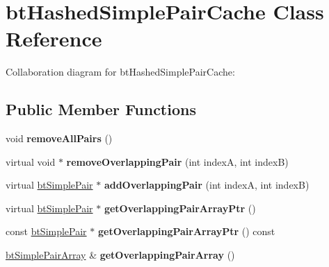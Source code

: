 \hypertarget{classbt_hashed_simple_pair_cache}{\section{bt\+Hashed\+Simple\+Pair\+Cache Class Reference}
\label{classbt_hashed_simple_pair_cache}
}


Collaboration diagram for bt\+Hashed\+Simple\+Pair\+Cache\+:
\subsection*{Public Member Functions}
\begin{DoxyCompactItemize}
\item 
\hypertarget{classbt_hashed_simple_pair_cache_aff97f2604b1c3b0ffa2bc73458efb361}{void {\bfseries remove\+All\+Pairs} ()}\label{classbt_hashed_simple_pair_cache_aff97f2604b1c3b0ffa2bc73458efb361}

\item 
\hypertarget{classbt_hashed_simple_pair_cache_afb66e5568574b8a2abf6010c85825ada}{virtual void $\ast$ {\bfseries remove\+Overlapping\+Pair} (int index\+A, int index\+B)}\label{classbt_hashed_simple_pair_cache_afb66e5568574b8a2abf6010c85825ada}

\item 
\hypertarget{classbt_hashed_simple_pair_cache_ae86e64195cae4126ee4089e45633e3ae}{virtual \hyperlink{structbt_simple_pair}{bt\+Simple\+Pair} $\ast$ {\bfseries add\+Overlapping\+Pair} (int index\+A, int index\+B)}\label{classbt_hashed_simple_pair_cache_ae86e64195cae4126ee4089e45633e3ae}

\item 
\hypertarget{classbt_hashed_simple_pair_cache_ab88a7dd4f4f640b357a454073e833902}{virtual \hyperlink{structbt_simple_pair}{bt\+Simple\+Pair} $\ast$ {\bfseries get\+Overlapping\+Pair\+Array\+Ptr} ()}\label{classbt_hashed_simple_pair_cache_ab88a7dd4f4f640b357a454073e833902}

\item 
\hypertarget{classbt_hashed_simple_pair_cache_a08664e6ad2220a9b51a7aba69de68252}{const \hyperlink{structbt_simple_pair}{bt\+Simple\+Pair} $\ast$ {\bfseries get\+Overlapping\+Pair\+Array\+Ptr} () const }\label{classbt_hashed_simple_pair_cache_a08664e6ad2220a9b51a7aba69de68252}

\item 
\hypertarget{classbt_hashed_simple_pair_cache_ac0875ac64391ff59021a10ea0e6181c7}{\hyperlink{classbt_aligned_object_array}{bt\+Simple\+Pair\+Array} \& {\bfseries get\+Overlapping\+Pair\+Array} ()}\label{classbt_hashed_simple_pair_cache_ac0875ac64391ff59021a10ea0e6181c7}


\end{DoxyCompactItemize}
